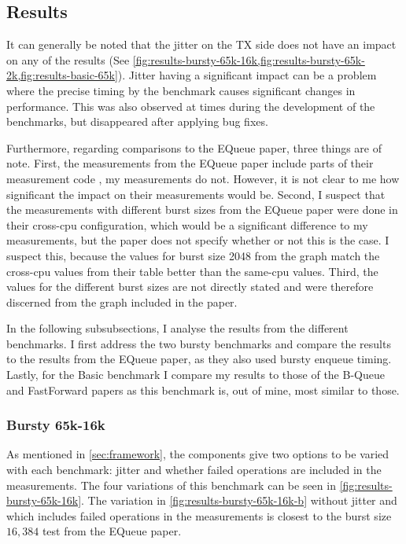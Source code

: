 \subsection{Results}
It can generally be noted that the jitter on the TX side does not have an impact on any of the results
(See \cref{fig:results-bursty-65k-16k,fig:results-bursty-65k-2k,fig:results-basic-65k}).
Jitter having a significant impact can be a problem where the precise timing by the benchmark causes
significant changes in performance.
This was also observed at times during the development of the benchmarks, but disappeared after applying bug fixes.

Furthermore, regarding comparisons to the EQueue paper, three things are of note.
First, the measurements from the EQueue paper include parts of their measurement code , my measurements do not.
However, it is not clear to me how significant the impact on their measurements would be.
Second, I suspect that the measurements with different burst sizes from the EQueue paper were done in their
cross-cpu configuration,
which would be a significant difference to my measurements, but the paper does not specify whether or not
this is the case.
I suspect this, because the values for burst size 2048 from the graph match the cross-cpu values from their
table better than the same-cpu values.
Third, the values for the different burst sizes are not directly stated and were therefore discerned from the
graph included in the paper.

In the following subsubsections, I analyse the results from the different benchmarks.
I first address the two bursty benchmarks and compare the results to the results from the EQueue paper, as
they also used bursty enqueue timing.
Lastly, for the Basic benchmark I compare my results to those of the B-Queue and FastForward papers as this
benchmark is, out of mine, most similar to those.






\subsubsection{Bursty 65k-16k}
As mentioned in \autoref{sec:framework}, the components give two options to be varied with each benchmark:
jitter and whether failed operations are included in the measurements.
The four variations of this benchmark can be seen in \autoref{fig:results-bursty-65k-16k}.
The variation in \autoref{fig:results-bursty-65k-16k-b} without jitter and which includes failed operations
in the measurements is closest to the burst size $16,384$ test from the EQueue paper\cite{EQueue}.

